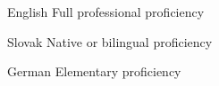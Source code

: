 \begin{cvskills}

  \cvskill
    {English}
    {Full professional proficiency}

  \cvskill
    {Slovak}
    {Native or bilingual proficiency}

  \cvskill    
    {German}
    {Elementary proficiency}

\end{cvskills}
